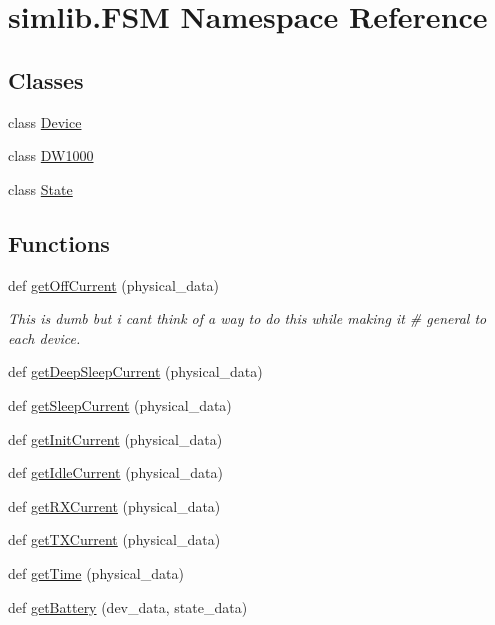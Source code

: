 \hypertarget{namespacesimlib_1_1_f_s_m}{}\section{simlib.\+F\+SM Namespace Reference}
\label{namespacesimlib_1_1_f_s_m}
\subsection*{Classes}
\begin{DoxyCompactItemize}
\item 
class \mbox{\hyperlink{classsimlib_1_1_f_s_m_1_1_device}{Device}}
\item 
class \mbox{\hyperlink{classsimlib_1_1_f_s_m_1_1_d_w1000}{D\+W1000}}
\item 
class \mbox{\hyperlink{classsimlib_1_1_f_s_m_1_1_state}{State}}
\end{DoxyCompactItemize}
\subsection*{Functions}
\begin{DoxyCompactItemize}
\item 
def \mbox{\hyperlink{namespacesimlib_1_1_f_s_m_ad5212728fbbcd07317b41dcadd83abf5}{get\+Off\+Current}} (physical\+\_\+data)
\begin{DoxyCompactList}\small\item\em This is dumb but i cant think of a way to do this while making it \# general to each device. \end{DoxyCompactList}\item 
def \mbox{\hyperlink{namespacesimlib_1_1_f_s_m_a327a557b074384ce208b09d4ec807432}{get\+Deep\+Sleep\+Current}} (physical\+\_\+data)
\item 
def \mbox{\hyperlink{namespacesimlib_1_1_f_s_m_a725cd2ce73a773f4ea7d01dede859fe5}{get\+Sleep\+Current}} (physical\+\_\+data)
\item 
def \mbox{\hyperlink{namespacesimlib_1_1_f_s_m_a585836de7988c4c8a00953ff69743ebb}{get\+Init\+Current}} (physical\+\_\+data)
\item 
def \mbox{\hyperlink{namespacesimlib_1_1_f_s_m_a794c6f3e74c219f76fce65bc83c37cf2}{get\+Idle\+Current}} (physical\+\_\+data)
\item 
def \mbox{\hyperlink{namespacesimlib_1_1_f_s_m_a63cebb729f3311d63c6d9c4604dd7528}{get\+R\+X\+Current}} (physical\+\_\+data)
\item 
def \mbox{\hyperlink{namespacesimlib_1_1_f_s_m_acbc6fcdb50f1784bcbc559a80962816e}{get\+T\+X\+Current}} (physical\+\_\+data)
\item 
def \mbox{\hyperlink{namespacesimlib_1_1_f_s_m_a11348c0ee93cab46de076fcf8ec8395f}{get\+Time}} (physical\+\_\+data)
\item 
def \mbox{\hyperlink{namespacesimlib_1_1_f_s_m_a61b3092e8c2bea57757c200b5cd1142d}{get\+Battery}} (dev\+\_\+data, state\+\_\+data)
\end{DoxyCompactItemize}
